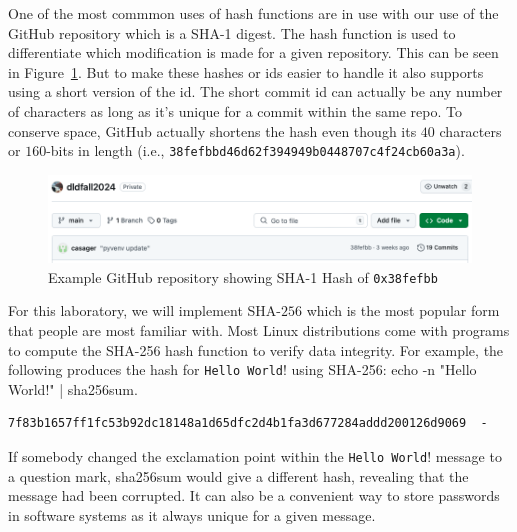 \documentclass{article}
\begin{document}
One of the most commmon uses of hash functions are in use with our use
of the GitHub repository which is a SHA-1 digest.
The hash function is used to differentiate
which modification is made for a given repository.  This can be seen
in Figure~\ref{sha.fig}.
But to make these hashes or ids easier to handle it also supports using a
short version of the id. The short commit id can actually be any
number of characters as long as it's unique for a commit within the
same repo.
To conserve space, GitHub actually shortens
the hash even though its $40$ characters or $160$-bits in length (i.e.,
\verb!38fefbbd46d62f394949b0448707c4f24cb60a3a!). 
\begin{figure} [t!]
  \centering
  \includegraphics[scale=0.5]{github.png}
  \caption{Example GitHub repository showing SHA-1 Hash of \texttt{0x38fefbb}}
  \label{sha.fig}
\end{figure}

For this laboratory, we will implement SHA-$256$ which is the most
popular form that people are most familiar with. Most Linux
distributions come with programs to compute the SHA-256 hash function
to verify data integrity. For example, the following produces the hash
for \verb!Hello World!! using SHA-256: echo -n "Hello World!" |
sha256sum.  
\begin{verbatim}
7f83b1657ff1fc53b92dc18148a1d65dfc2d4b1fa3d677284addd200126d9069  -
\end{verbatim}
If somebody changed the exclamation point within the
\verb!Hello World!! message to a question
mark, sha256sum would give a different hash, revealing that the
message had been corrupted.  It can also be a convenient way to store
passwords in software systems as it always unique for a given message.
\end{document}
